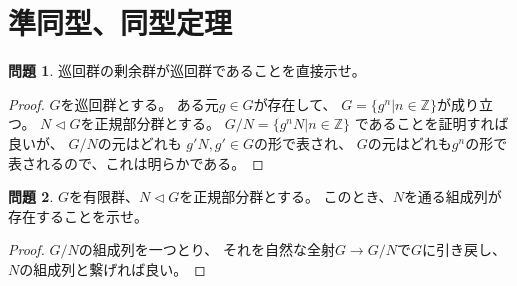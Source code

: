 \documentclass[uplatex]{jsreport}
\theoremstyle{definition}
\newtheorem{prob}[prob]{問題}
\newcommand{\Z}{\mathbb{Z}}
\begin{document}
\section{準同型、同型定理}


\begin{prob}
  巡回群の剰余群が巡回群であることを直接示せ。
\end{prob}

\begin{proof}
  \(G\)を巡回群とする。
  ある元\(g\in G\)が存在して、
  \(G = \{g^n | n\in \Z\}\)が成り立つ。
  \(N\lhd G\)を正規部分群とする。
  \(G/N = \{g^nN | n \in \Z\}\)
  であることを証明すれば良いが、
  \(G/N\)の元はどれも
  \(g'N, g'\in G\)の形で表され、
  \(G\)の元はどれも\(g^n\)の形で表されるので、これは明らかである。
\end{proof}



\begin{prob}
  \(G\)を有限群、\(N\lhd G\)を正規部分群とする。
  このとき、\(N\)を通る組成列が存在することを示せ。
\end{prob}

\begin{proof}
  \(G/N\)の組成列を一つとり、
  それを自然な全射\(G\to G/N\)で\(G\)に引き戻し、
  \(N\)の組成列と繋げれば良い。
\end{proof}
\end{document}

